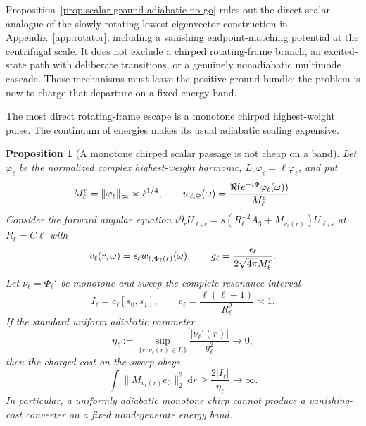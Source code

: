 \documentclass[11pt]{article}
\newcommand{\dd}{\,\mathrm d}
\newtheorem{proposition}[theorem]{Proposition}
\theoremstyle{definition}
\theoremstyle{remark}
\begin{document}
Proposition~\ref{prop:scalar-ground-adiabatic-no-go} rules out the direct scalar
analogue of the slowly rotating lowest-eigenvector construction in
Appendix~\ref{app:rotator}, including a vanishing endpoint-matching potential
at the centrifugal scale.  It does not exclude a chirped rotating-frame branch,
an excited-state path with deliberate transitions, or a genuinely nonadiabatic
multimode cascade.  Those mechanisms must leave the positive ground bundle;
the problem is now to charge that departure on a fixed energy band.

The most direct rotating-frame escape is a monotone chirped highest-weight
pulse.  The continuum of energies makes its usual adiabatic scaling expensive.

\begin{proposition}[A monotone chirped scalar passage is not cheap on a band]
\label{prop:chirped-ensemble-cost}
Let $\varphi_\ell$ be the normalized complex highest-weight harmonic,
$L_z\varphi_\ell=\ell\varphi_\ell$, and put
\begin{equation}
 M_\ell^{\rm c}=\|\varphi_\ell\|_\infty\asymp\ell^{1/4},
 \qquad
 w_{\ell,\Phi}(\omega)=
 \frac{\Re(e^{-i\Phi}\varphi_\ell(\omega))}{M_\ell^{\rm c}}.
\end{equation}
Consider the forward angular equation
$i\partial_rU_{\ell,s}=s(R_\ell^{-2}A_3+M_{v_\ell(r)})U_{\ell,s}$ at
$R_\ell=C\ell$ with
\begin{equation}
 v_\ell(r,\omega)=\epsilon_\ell
 w_{\ell,\Phi_\ell(r)}(\omega),
 \qquad
 g_\ell=\frac{\epsilon_\ell}
 {2\sqrt{4\pi}M_\ell^{\rm c}}.
 \label{eq:chirped-highest-weight-control}
\end{equation}
Let $\nu_\ell=\Phi_\ell'$ be monotone and sweep the complete resonance interval
\begin{equation}
 I_\ell=c_\ell[s_0,s_1],
 \qquad c_\ell=\frac{\ell(\ell+1)}{R_\ell^2}\asymp1.
\end{equation}
If the standard uniform adiabatic parameter
\begin{equation}
 \eta_\ell:=
 \sup_{\{r:\nu_\ell(r)\in I_\ell\}}
 \frac{|\nu_\ell'(r)|}{g_\ell^2}
 \longrightarrow0,
 \label{eq:chirped-adiabatic-parameter}
\end{equation}
then the charged cost on the sweep obeys
\begin{equation}
 \int\|M_{v_\ell(r)}e_0\|_2^2\dd r
 \geq\frac{2|I_\ell|}{\eta_\ell}\longrightarrow\infty.
 \label{eq:chirped-ensemble-cost}
\end{equation}
In particular, a uniformly adiabatic monotone chirp cannot produce a
vanishing-cost converter on a fixed nondegenerate energy band.
\end{proposition}
\end{document}
